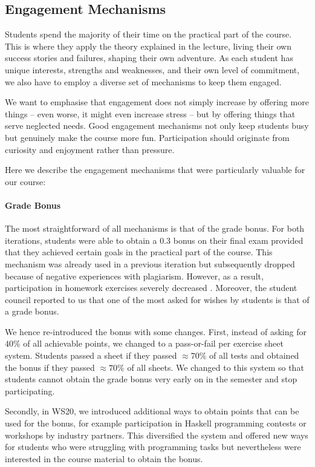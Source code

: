 \subsection{Engagement Mechanisms}

Students spend the majority of their time on the practical part of the course.
This is where they apply the theory explained in the lecture,
living their own success stories and failures,
shaping their own adventure.
As each student has unique interests, strengths and weaknesses, and their own level of commitment,
we also have to employ a diverse set of mechanisms to keep them engaged.

We want to emphasise that engagement does not simply
increase by offering more things -- even worse, it might even increase stress --
but by offering things that serve neglected needs.
Good engagement mechanisms not only keep students busy
but genuinely make the course more fun.
Participation should originate from curiosity and enjoyment rather than pressure.

Here we describe the engagement mechanisms that were particularly valuable for our course:

\paragraph{Grade Bonus}
The most straightforward of all mechanisms is
that of the grade bonus.
For both iterations,
students were able to obtain a 0.3 bonus on their final exam provided that they achieved certain goals in the practical part of the course.
This mechanism was already used in a previous iteration
but subsequently dropped because of negative experiences with plagiarism.
However, as a result, participation in homework exercises
severely decreased \citep{next_1100}.
Moreover, the student council reported to us that one of the most asked for
wishes by students is that of a grade bonus.

We hence re-introduced the bonus with some changes.
First, instead of asking for $40\%$ of all achievable points,
we changed to a pass-or-fail per exercise sheet system.
Students passed a sheet if they
passed $\approx 70\%$ of all tests
and obtained the bonus if they passed $\approx 70\%$ of all sheets.
We changed to this system so that students
cannot obtain the grade bonus very early on in the semester and stop participating.

Secondly, in WS20, we introduced additional ways to
obtain points that can be used for the bonus,
for example participation in Haskell programming contests or workshops by industry partners.
This diversified the system and offered new ways for students who were struggling
with programming tasks but nevertheless were interested in the course material
to obtain the bonus.

